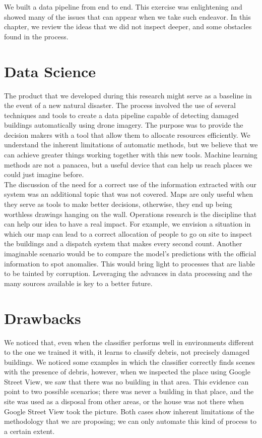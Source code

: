 


We built a data pipeline from end to end. This exercise was enlightening and showed many of the issues that can appear when we take such endeavor. In this chapter, we review the ideas that we did not inspect deeper, and some obstacles found in the process.\\

\section{Data Science}

The product that we developed during this research might serve as a baseline in the event of a new natural disaster. The process involved the use of several techniques and tools to create a data pipeline capable of detecting damaged buildings automatically using drone imagery. The purpose was to provide the decision makers with a tool that allow them to allocate resources efficiently. We understand the inherent limitations of automatic methods, but we believe that we can achieve greater things working together with this new tools. Machine learning methods are not a panacea, but a useful device that can help us reach places we could just imagine before.\\

The discussion of the need for a correct use of the information extracted with our system was an additional topic that was not covered. Maps are only useful when they serve as tools to make better decisions, otherwise, they end up being worthless drawings hanging on the wall. Operations research is the discipline that can help our idea to have a real impact. For example, we envision a situation in which our map can lead to a correct allocation of people to go on site to inspect the buildings and a dispatch system that makes every second count. Another imaginable scenario would be to compare the model's predictions with the official information to spot anomalies. This would bring light to processes that are liable to be tainted by corruption. Leveraging the advances in data processing and the many sources available is key to a better future.\\

\section{Drawbacks}

We noticed that, even when the classifier performs well in environments different to the one we trained it with, it learns to classify debris, not precisely damaged buildings. We noticed some examples in which the classifier correctly finds scenes with the presence of debris, however, when we inspected the place using Google Street View, we saw that there was no building in that area. This evidence can point to two possible scenarios; there was never a building in that place, and the site was used as a disposal from other areas, or the house was not there when Google Street View took the picture. Both cases show inherent limitations of the methodology that we are proposing; we can only automate this kind of process to a certain extent.\\

